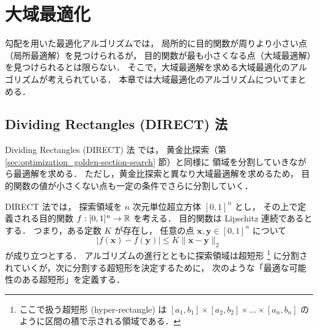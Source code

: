 %

\chapter{大域最適化}

勾配を用いた最適化アルゴリズムでは，
局所的に目的関数が周りより小さい点（局所最適解）を見つけられるが，
目的関数が最も小さくなる点（大域最適解）を見つけられるとは限らない．
そこで，大域最適解を求める大域最適化のアルゴリズムが考えられている．
本章では大域最適化のアルゴリズムについてまとめる．

\section{Dividing Rectangles (DIRECT) 法}\label{sec:optimization_direct}

Dividing Rectangles (DIRECT) 法 \cite{Jones1993} では，
黄金比探索（第 \ref{sec:optimization_golden-section-search} 節）と同様に
領域を分割していきながら最適解を求める．
ただし，黄金比探索と異なり大域最適解を求めるため，
目的関数の値が小さくない点も一定の条件でさらに分割していく．

DIRECT 法では，
探索領域を $n$ 次元単位超立方体 $[0, 1]^n$ とし，
その上で定義される目的関数 $f : [0, 1]^n \to \mathbb{R}$ を考える．
目的関数は  Lipschitz 連続であるとする．
つまり，ある定数 $K$ が存在し，
任意の点 $\bm{x}, \bm{y} \in [0, 1]^n$ について
\begin{equation}
    |f(\bm{x}) - f(\bm{y})| \le K \|\bm{x} - \bm{y}\|_2
\end{equation}
が成り立つとする．
アルゴリズムの進行とともに探索領域は超短形
\footnote{ここで扱う超短形 (hyper-rectangle) は%
    $[a_1, b_1] \times [a_2, b_2] \times \ldots \times [a_n, b_n]$%
    のように区間の積で示される領域である．}
に分割されていくが，次に分割する超短形を決定するために，
次のような「最適な可能性のある超短形」を定義する．

